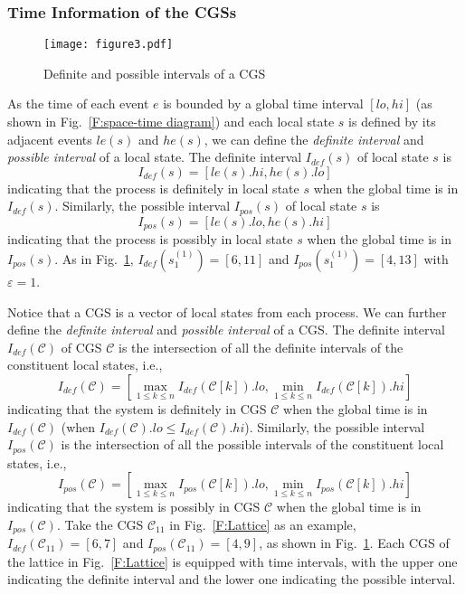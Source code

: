 \documentclass[10pt,conference,compsocconf,letterpaper]{IEEEtran}
\begin{document}
\subsubsection{Time Information of the CGSs}
\begin{figure}[tbp]
\begin{center}
  \texttt{[image: figure3.pdf]}
  \caption{Definite and possible intervals of a CGS}
  \label{F:di and pi}
\end{center}
\end{figure}

As the time of each event $e$ is bounded by a global time interval $[lo,hi]$ (as shown in Fig.~\ref{F:space-time diagram}) and each local state $s$ is defined by its adjacent events $le(s)$ and $he(s)$, we can define the \textit{definite interval} and \textit{possible interval} of a local state. The definite interval $I_{def}(s)$ of local state $s$ is $$I_{def}(s)=[le(s).hi, he(s).lo]$$
indicating that the process is definitely in local state $s$ when the global time is in $I_{def}(s)$. Similarly, the possible interval $I_{pos}(s)$ of local state $s$ is $$I_{pos}(s)=[le(s).lo, he(s).hi]$$
indicating that the process is possibly in local state $s$ when the global time is in $I_{pos}(s)$. As in Fig.~\ref{F:di and pi}, $I_{def}(s^{(1)}_1)=[6,11]$ and $I_{pos}(s^{(1)}_1)=[4,13]$ with $\varepsilon=1$.

Notice that a CGS is a vector of local states from each process. We can further define the \textit{definite interval} and \textit{possible interval} of a CGS. The definite interval $I_{def}(\mathcal{C})$ of CGS $\mathcal{C}$ is the intersection of all the definite intervals of the constituent local states, i.e.,
$$I_{def}(\mathcal{C})=[\max\limits_{1\leq k \leq n}{I_{def}(\mathcal{C}[k]).lo}, \min\limits_{1\leq k \leq n}{I_{def}(\mathcal{C}[k]).hi}]$$
indicating that the system is definitely in CGS $\mathcal{C}$ when the global time is in $I_{def}(\mathcal{C})$ (when $I_{def}(\mathcal{C}).lo \leq I_{def}(\mathcal{C}).hi$). Similarly, the possible interval $I_{pos}(\mathcal{C})$ is the intersection of all the possible intervals of the constituent local states, i.e.,
$$I_{pos}(\mathcal{C})=[\max\limits_{1\leq k \leq n}{I_{pos}(\mathcal{C}[k]).lo}, \min\limits_{1\leq k \leq n}{I_{pos}(\mathcal{C}[k]).hi}]$$
indicating that the system is possibly in CGS $\mathcal{C}$ when the global time is in $I_{pos}(\mathcal{C})$. Take the CGS $\mathcal{C}_{11}$ in Fig.~\ref{F:Lattice} as an example, $I_{def}(\mathcal{C}_{11}) = [6,7]$ and $I_{pos}(\mathcal{C}_{11}) = [4,9]$, as shown in Fig.~\ref{F:di and pi}. Each CGS of the lattice in Fig.~\ref{F:Lattice} is equipped with time intervals, with the upper one indicating the definite interval and the lower one indicating the possible interval.
\end{document}
